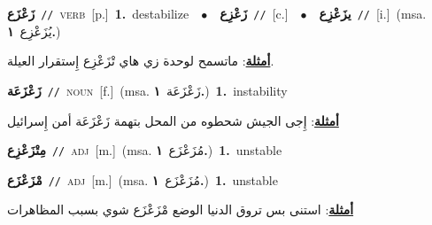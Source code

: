 \documentclass[10pt,a4paper,twoside]{article} %
\begin{document}
\begin{multicols}{2}
{\setlength\topsep{0pt}\textbf{\foreignlanguage{arabic}{زَعْزَع}}\ {\color{gray}\texttt{//}\color{black}}\ \textsc{verb}\ [p.]\ \textbf{1.}~destabilize\ \ $\bullet$\ \ \setlength\topsep{0pt}\textbf{\foreignlanguage{arabic}{زَعْزِع}}\ {\color{gray}\texttt{//}\color{black}}\ [c.]\ \ $\bullet$\ \ \setlength\topsep{0pt}\textbf{\foreignlanguage{arabic}{يزَعْزِع}}\ {\color{gray}\texttt{//}\color{black}}\ [i.]\ \color{gray}(msa. \foreignlanguage{arabic}{يُزَعْزِع}~\foreignlanguage{arabic}{\textbf{١.}})\color{black}\  \begin{flushright}\color{gray}\foreignlanguage{arabic}{\textbf{\underline{\foreignlanguage{arabic}{أمثلة}}}: ماتسمح لوحدة زي هاي تْزَعْزِع إِستقرار العيلة.}\end{flushright}\color{black}} \vspace{2mm}

{\setlength\topsep{0pt}\textbf{\foreignlanguage{arabic}{زَعْزَعَة}}\ {\color{gray}\texttt{//}\color{black}}\ \textsc{noun}\ [f.]\ \color{gray}(msa. \foreignlanguage{arabic}{زَعْزَعَة}~\foreignlanguage{arabic}{\textbf{١.}})\color{black}\ \textbf{1.}~instability\  \begin{flushright}\color{gray}\foreignlanguage{arabic}{\textbf{\underline{\foreignlanguage{arabic}{أمثلة}}}: إِجى الجيش شحطوه من المحل بتهمة زَعْزَعَة أمن إِسرائيل}\end{flushright}\color{black}} \vspace{2mm}

{\setlength\topsep{0pt}\textbf{\foreignlanguage{arabic}{مِتْزَعْزِع}}\ {\color{gray}\texttt{//}\color{black}}\ \textsc{adj}\ [m.]\ \color{gray}(msa. \foreignlanguage{arabic}{مُزَعْزَع}~\foreignlanguage{arabic}{\textbf{١.}})\color{black}\ \textbf{1.}~unstable\ } \vspace{2mm}

{\setlength\topsep{0pt}\textbf{\foreignlanguage{arabic}{مْزَعْزَع}}\ {\color{gray}\texttt{//}\color{black}}\ \textsc{adj}\ [m.]\ \color{gray}(msa. \foreignlanguage{arabic}{مُزَعْزَع}~\foreignlanguage{arabic}{\textbf{١.}})\color{black}\ \textbf{1.}~unstable\  \begin{flushright}\color{gray}\foreignlanguage{arabic}{\textbf{\underline{\foreignlanguage{arabic}{أمثلة}}}: استنى بس تروق الدنيا الوضع مْزَعْزَع شوي بسبب المظاهرات}\end{flushright}\color{black}} \vspace{2mm}


\end{multicols}
\end{document}
